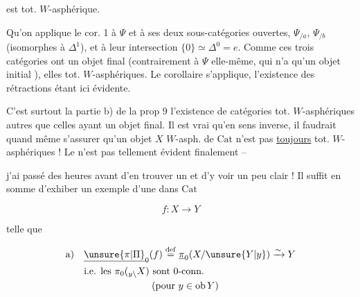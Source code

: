 
est tot. $W$-asphérique.


Qu'on applique le cor. 1 à $\Psi$ et à ses deux sous-catégories ouvertes, $\Psi_{/a}$, $\Psi_{/b}$ (isomorphes à $\Delta^1$), et à leur intersection $\{0\}\simeq\Delta^0=e$. Comme ces trois catégories ont un objet final (contrairement à $\Psi$ elle-même, qui n'a qu'un objet initial ), elles  tot. $W$-asphériques. Le corollaire s'applique, l'existence des rétractions  étant ici évidente.


C'est surtout la partie b)  de la prop 9  l'existence de catégories tot. $W$-asphériques autres que celles ayant un objet final. Il est vrai qu'en sens inverse, il faudrait quand même s'assurer qu'un objet $X$ $W$-asph. de $\mathrm{Cat}$ n'est pas \uline{toujours} tot. $W$-asphériques ! Le  n'est pas tellement évident finalement --

j'ai passé des heures avant d'en trouver un et d'y voir un peu clair ! Il suffit en somme d'exhiber un exemple d'une  dans $\mathrm{Cat}$

\[
 f:X\longrightarrow Y
\]

telle que

\[
\begin{aligned}
\text{a)}\quad &\underline{\unsure{\pi|\Pi}}_0(f)\overset{\mathrm{def}}{=}\underline{\pi}_0(X/\unsure{Y|y})\xrightarrow{\sim}Y\\
&\text{i.e. les }\pi_0({}_{y\backslash}X)\text{ sont 0-conn.}\\
&\hspace{7em}(\text{pour }y\in\mathrm{ob}\, Y)
\end{aligned}
\]


